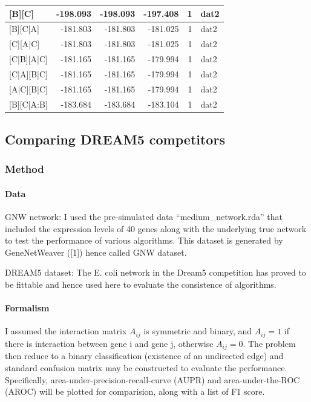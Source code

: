 \documentclass[]{article}
\let\oldparagraph\paragraph
\renewcommand{\paragraph}[1]{\oldparagraph{#1}\mbox{}}
\theoremstyle{definition}
\theoremstyle{definition}
\theoremstyle{definition}
\theoremstyle{remark}
\begin{document}
\begin{table}
\begin{tabular}[t]{l|r|r|r|r|l}
\hline
[A][B][C] & -198.093 & -198.093 & -197.408 & 1 & dat2\\
\hline
[A][B][C|A] & -181.803 & -181.803 & -181.025 & 1 & dat2\\
\hline
[B][C][A|C] & -181.803 & -181.803 & -181.025 & 1 & dat2\\
\hline
[B][C|B][A|C] & -181.165 & -181.165 & -179.994 & 1 & dat2\\
\hline
[A][C|A][B|C] & -181.165 & -181.165 & -179.994 & 1 & dat2\\
\hline
[C][A|C][B|C] & -181.165 & -181.165 & -179.994 & 1 & dat2\\
\hline
[A][B][C|A:B] & -183.684 & -183.684 & -183.104 & 1 & dat2\\
\hline
\end{tabular}
\end{table}

\subsection{Comparing DREAM5
competitors}\label{comparing-dream5-competitors}

\subsubsection{Method}\label{method}

\paragraph{Data}\label{data}

GNW network: I used the pre-simulated data ``medium\_network.rda'' that
included the expression levels of 40 genes along with the underlying
true network to test the performance of various algorithms. This dataset
is generated by GeneNetWeaver ({[}1{]}) hence called GNW dataset.

DREAM5 dataset: The E. coli network in the Dream5 competition has proved
to be fittable and hence used here to evaluate the consistence of
algorithms.

\paragraph{Formalism}\label{formalism}

I assumed the interaction matrix \(A_{ij}\) is symmetric and binary, and
\(A_{ij}=1\) if there is interaction between gene i and gene j,
otherwise \(A_{ij}=0\). The problem then reduce to a binary
classification (existence of an undirected edge) and standard confusion
matrix may be constructed to evaluate the performance. Specifically,
area-under-precision-recall-curve (AUPR) and area-under-the-ROC (AROC)
will be plotted for comparision, along with a list of F1 score.
\end{document}
